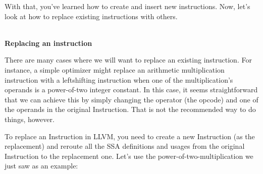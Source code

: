 With that, you've learned how to create and insert new instructions. Now, let's look at how to replace existing instructions with others.


\hspace*{\fill} \\ %
\noindent
\textbf{Replacing an instruction}

There are many cases where we will want to replace an existing instruction. For instance, a simple optimizer might replace an arithmetic multiplication instruction with a leftshifting instruction when one of the multiplication's operands is a power-of-two integer constant. In this case, it seems straightforward that we can achieve this by simply changing the operator (the opcode) and one of the operands in the original Instruction. That is not the recommended way to do things, however.

To replace an Instruction in LLVM, you need to create a new Instruction (as the replacement) and reroute all the SSA definitions and usages from the original Instruction to the replacement one. Let's use the power-of-two-multiplication we just saw as an example:

